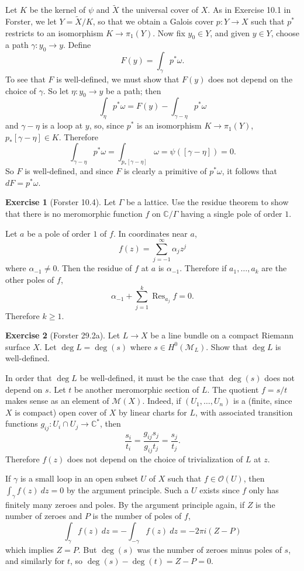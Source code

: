 \documentclass[10pt]{article}
\newcommand{\CC}{\mathbb{C}}
\DeclareMathOperator*{\Res}{Res}
\newcommand{\Mero}{\mathscr M}
\newcommand{\Olo}{\mathscr O}
\theoremstyle{definition}
\newtheorem{exer}{Exercise}
\begin{document}
Let $K$ be the kernel of $\psi$ and $\tilde X$ the universal cover of $X$.
As in Exercise 10.1 in Forster, we let $Y = \tilde X/K$, so that we obtain a Galois cover $p: Y \to X$ such that $p^*$ restricts to an isomorphism $K \to \pi_1(Y)$.
Now fix $y_0 \in Y$, and given $y \in Y$, choose a path $\gamma: y_0 \to y$. Define
$$F(y) = \int_\gamma p^*\omega.$$
To see that $F$ is well-defined, we must show that $F(y)$ does not depend on the choice of $\gamma$.
So let $\eta: y_0 \to y$ be a path; then
$$\int_\eta p^*\omega = F(y) - \int_{\gamma - \eta} p^*\omega$$
and $\gamma - \eta$ is a loop at $y$, so, since $p^*$ is an isomorphism $K \to \pi_1(Y)$, $p_*[\gamma - \eta] \in K$. Therefore
$$\int_{\gamma - \eta} p^*\omega = \int_{p_*[\gamma - \eta]} \omega = \psi([\gamma - \eta]) = 0.$$
So $F$ is well-defined, and since $F$ is clearly a primitive of $p^*\omega$, it follows that $dF = p^*\omega$.

\begin{exer}[Forster 10.4]
Let $\Gamma$ be a lattice. Use the residue theorem to show that there is no meromorphic function $f$ on $\CC/\Gamma$ having a single pole of order $1$.
\end{exer}

Let $a$ be a pole of order $1$ of $f$. In coordinates near $a$,
$$f(z) = \sum_{j=-1}^\infty \alpha_j z^j$$
where $\alpha_{-1} \neq 0$. Then the residue of $f$ at $a$ is $\alpha_{-1}$.
Therefore if $a_1, \dots, a_k$ are the other poles of $f$,
$$\alpha_{-1} + \sum_{j=1}^k \Res_{a_j}f = 0.$$
Therefore $k \geq 1$.

\begin{exer}[Forster 29.2a]
Let $L \to X$ be a line bundle on a compact Riemann surface $X$.
Let $\deg L = \deg (s)$ where $s \in H^0(\Mero_L)$.
Show that $\deg L$ is well-defined.
\end{exer}

In order that $\deg L$ be well-defined, it must be the case that $\deg(s)$ does not depend on $s$.
Let $t$ be another meromorphic section of $L$.
The quotient $f = s/t$ makes sense as an element of $\Mero(X)$.
Indeed, if $(U_1, \dots, U_n)$ is a (finite, since $X$ is compact) open cover of $X$ by linear charts for $L$, with associated transition functions $g_{ij}: U_i \cap U_j \to \CC^*$, then
$$\frac{s_i}{t_i} = \frac{g_{ij}s_j}{g_{ij}t_j} = \frac{s_j}{t_j}.$$
Therefore $f(z)$ does not depend on the choice of trivialization of $L$ at $z$.

If $\gamma$ is a small loop in an open subset $U$ of $X$ such that $f \in \Olo(U)$, then $\int_\gamma f(z) ~dz = 0$ by the argument principle.
Such a $U$ exists since $f$ only has finitely many zeroes and poles.
By the argument principle again, if $Z$ is the number of zeroes and $P$ is the number of poles of $f$,
$$\int_\gamma f(z) ~dz = -\int_{-\gamma} f(z) ~dz = -2\pi i(Z - P)$$
which implies $Z = P$. But $\deg (s)$ was the number of zeroes minus poles of $s$, and similarly for $t$, so $\deg (s) - \deg(t) = Z - P = 0$.
\end{document}
